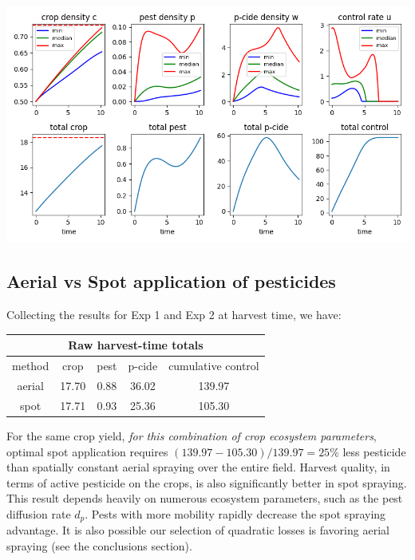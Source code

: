 \documentclass[11pt]{article}
\begin{document}
\begin{minipage}{\textwidth}
	\begin{center}
		\includegraphics[width=0.8\linewidth]{../scp_240604-085334/time.png}
	\end{center}
\end{minipage}

\subsection{Aerial vs Spot application of pesticides}

Collecting the results for Exp 1 and Exp 2 at harvest time, we have:

\begin{center}
	\begin{tabular}{ | c | c | c| c| c| }
	\hline
	\multicolumn{5}{|c|}{Raw harvest-time totals} \\
	\hline
    method & crop & pest & p-cide & cumulative control \\
    \hline
    aerial & 17.70 & 0.88 & 36.02 & 139.97 \\
    \hline
    spot & 17.71 & 0.93 & 25.36 & 105.30 \\
    \hline
    \end{tabular}
\end{center}

For the same crop yield, \textit{for this combination of crop ecosystem parameters}, optimal spot application requires $(139.97-105.30)/139.97 = 25\%$ less pesticide than spatially constant aerial spraying over the entire field. Harvest quality, in terms of active pesticide on the crops, is also significantly better in spot spraying. This result depends heavily on numerous ecosystem parameters, such as the pest diffusion rate $d_p$. Pests with more mobility rapidly decrease the spot spraying advantage. It is also possible our selection of quadratic losses is favoring aerial spraying (see the conclusions section).
\end{document}
